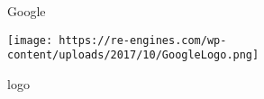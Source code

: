 \documentclass[12pt, a4paper]{article}
\begin{document}
  
  \begin{figure}\center
    \caption{Google}
    \texttt{[image: https://re-engines.com/wp-content/uploads/2017/10/GoogleLogo.png]}
    \caption{logo}
  \end{figure}
  
\end{document}
